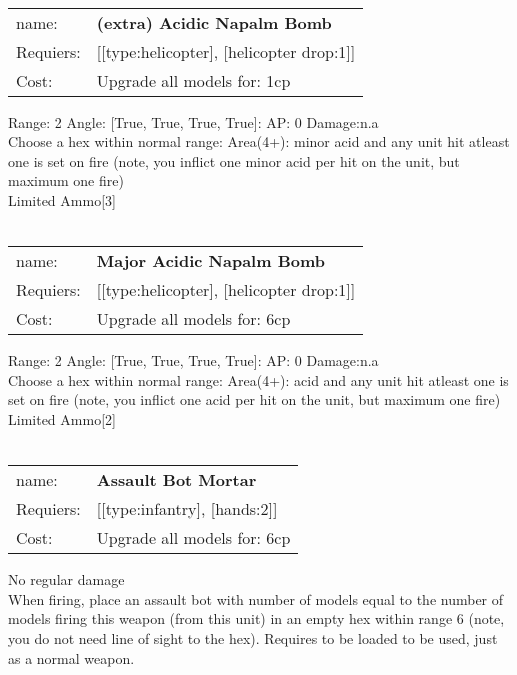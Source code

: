 \ \\
\begin{tabular}{ll}
name: & {\bf (extra) Acidic Napalm Bomb } \\
Requiers: & [[type:helicopter], [helicopter drop:1]] \\
Cost: & Upgrade all models for: 1cp \\
\end{tabular}



Range: 2  Angle: [True, True, True, True]: AP: 0 Damage:n.a \\
Choose a hex within normal range: Area(4+): minor acid and any unit hit atleast one is set on fire (note, you inflict one minor acid per hit on the unit, but maximum one fire)\\ 
Limited Ammo[3]\\ 








\ \\
\begin{tabular}{ll}
name: & {\bf Major Acidic Napalm Bomb } \\
Requiers: & [[type:helicopter], [helicopter drop:1]] \\
Cost: & Upgrade all models for: 6cp \\
\end{tabular}



Range: 2  Angle: [True, True, True, True]: AP: 0 Damage:n.a \\
Choose a hex within normal range: Area(4+): acid and any unit hit atleast one is set on fire (note, you inflict one acid per hit on the unit, but maximum one fire)\\ 
Limited Ammo[2]\\ 








\ \\
\begin{tabular}{ll}
name: & {\bf Assault Bot Mortar } \\
Requiers: & [[type:infantry], [hands:2]] \\
Cost: & Upgrade all models for: 6cp \\
\end{tabular}

No regular damage\\ 
When firing, place an assault bot with number of models equal to the number of models firing this weapon (from this unit) in an empty hex within range 6 (note, you do not need line of sight to the hex). Requires to be loaded to be used, just as a normal weapon.\\ 










